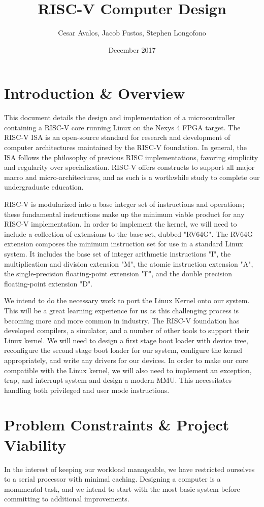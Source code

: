 \documentclass{article}
\title{RISC-V Computer Design}
\author{Cesar Avalos, Jacob Fustos, Stephen Longofono}
\date{December 2017}
\begin{document}
\maketitle

\section{Introduction  \& Overview}
This document details the design and implementation of a microcontroller containing a RISC-V core running Linux on the Nexys 4 FPGA target.  The RISC-V ISA is an open-source standard for research and development of computer architectures maintained by the RISC-V foundation.  In general, the ISA follows the philosophy of previous RISC implementations, favoring simplicity and regularity over specialization.  RISC-V offers constructs to support all major macro and micro-architectures, and as such is a worthwhile study to complete our undergraduate education.

RISC-V is modularized into a base integer set of instructions and operations; these fundamental instructions make up the minimum viable product for any RISC-V implementation\cite{RISCV_RDR}.  In order to implement the kernel, we will need to include a collection of extensions to the base set, dubbed "RV64G".  The RV64G extension composes the minimum instruction set for use in a standard Linux system.  It includes the base set of integer arithmetic instructions "I", the multiplication and division extension "M", the atomic instruction extension "A", the single-precision floating-point extension "F", and the double precision floating-point extension "D".

We intend to do the necessary work to port the Linux Kernel onto our system. This will be a great learning experience for us as this challenging process is becoming more and more common in industry. The RISC-V foundation has developed compilers, a simulator, and a number of other tools to support their Linux kernel\cite{RISCV_SS}.  We will need to design a first stage boot loader with device tree, reconfigure the second stage boot loader for our system, configure the kernel appropriately, and write any drivers for our devices. In order to make our core compatible with the Linux kernel, we will also need to implement an exception, trap, and interrupt system and design a modern MMU.  This necessitates handling both privileged and user mode instructions.

\section{Problem Constraints \& Project Viability}
In the interest of keeping our workload manageable, we have restricted ourselves to a serial processor with minimal caching.  Designing a computer is a monumental task, and we intend to start with the most basic system before committing to additional improvements.
\end{document}
